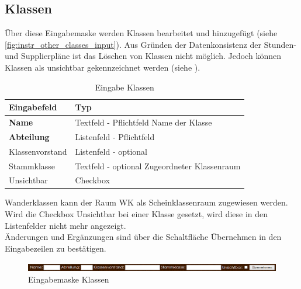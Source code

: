 \subsection{Klassen}
Über diese Eingabemaske werden Klassen bearbeitet und hinzugefügt (siehe \autoref{fig:instr_other_classes_input}). Aus Gründen der Datenkonsistenz der Stunden- und Supplierpläne ist das Löschen von Klassen nicht möglich. Jedoch können Klassen als unsichtbar gekennzeichnet werden (siehe ).
\begin{table}[H]
\centering
\begin{tabular}{p{3 cm}p{10 cm}}
   \toprule
   \textbf{Eingabefeld} & \textbf{Typ} \\
   \midrule
          \textbf{Name} & Textfeld - Pflichtfeld \newline Name der Klasse \\
          \hline
          \textbf{Abteilung} & Listenfeld - Pflichtfeld \\
          \hline
          Klassenvorstand & Listenfeld - optional \\
          \hline
          Stammklasse & Textfeld - optional \newline Zugeordneter Klassenraum \\
          \hline
          Unsichtbar & Checkbox \\
   \bottomrule
\end{tabular}
\caption{Eingabe Klassen}
\end{table}
Wanderklassen kann der Raum WK als Scheinklassenraum zugewiesen werden. Wird die Checkbox Unsichtbar bei einer Klasse gesetzt, wird diese in den Listenfelder nicht mehr angezeigt.\\
Änderungen und Ergänzungen sind über die Schaltfläche Übernehmen in den Eingabezeilen zu bestätigen.
\begin{figure}[H]
\centering
\includegraphics[keepaspectratio=true, width=14cm]{images/screenshots/classes_input.png}
\caption{Eingabemaske Klassen}
\label{fig:instr_other_classes_input}
\end{figure}
